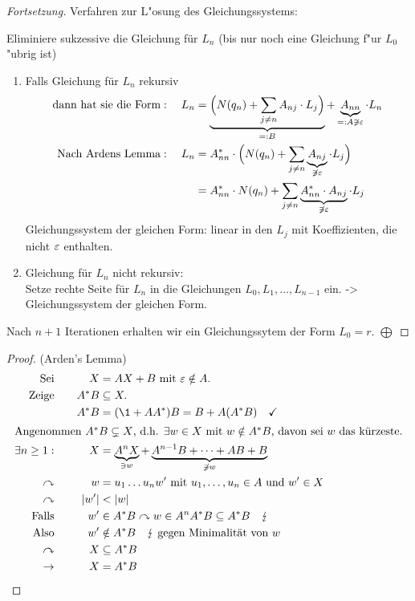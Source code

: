 \begin{proof}[Fortsetzung]
    Verfahren zur L"osung des Gleichungssystems:
    
	Eliminiere sukzessive die Gleichung für $L_n$ (bis nur noch eine Gleichung f"ur $L_0$ "ubrig ist)
	\begin{enumerate}[label=(\arabic*)]
		\item Falls Gleichung für $L_n$ rekursiv
			\begin{align*}
				\text{dann hat sie die Form}:\quad L_n &= \underbrace{\Big( N(q_n)+\sum_{j\neq n} A_{nj}\cdot L_j \Big)}_{=: B} + \underbrace{A_{nn}}_{=: A \not\ni \varepsilon}\cdot L_n\\
				\text{Nach Ardens Lemma}:\quad L_n &= A_{nn}^*\cdot \Big( N(q_n)+\sum_{j\neq n} \underbrace{A_{nj}}_{\not\ni\varepsilon} \cdot L_j \Big)\\
				&= A_{nn}^*\cdot N(q_n) + \sum_{j\neq n} \underbrace{A_{nn}^*\cdot A_{nj}}_{\not\ni\varepsilon} \cdot L_j
			\end{align*}
			Gleichungssystem der gleichen Form: linear in den $L_j$ mit Koeffizienten, die nicht $\varepsilon$ enthalten.
		\item Gleichung für $L_n$ nicht rekursiv:\\
		Setze rechte Seite für $L_n$ in die Gleichungen $L_0, L_1, \dots, L_{n-1}$ ein. \--> Gleichungssystem der gleichen Form.
	\end{enumerate}
    Nach $n+1$ Iterationen erhalten wir ein Gleichungssytem der Form $L_0=r$. \hfill$\bigoplus$
\end{proof}
\begin{proof}(Arden's Lemma)
	\begin{alignat*}{3}
		\text{Sei}&\quad& X&= AX+B\text{ mit }\Eps\notin A.\\
		\text{Zeige}&& A^*B&\subseteq X.\\
		&& A^*B &= (\1+AA^*)B = B+A(A^*B) \quad\checkmark\\
		\shortintertext{Angenommen $A^*B \subsetneq X$, d.h. $\exists w\in X$ mit $w\notin A^*B$, davon sei $w$ das kürzeste.}
		\exists n\geq 1: && X &= \underbrace{A^nX}_{\ni w} + \underbrace{A^{n-1}B+\dots +AB+B}_{\not\ni w}\\
		\curvearrowright && w &= u_1\dots u_n w'\text{ mit } u_1,\dots,u_n\in A\text{ und } w'\in X\\
		\curvearrowright && |w'| &< |w|\\
		\text{Falls}&& w'&\in A^*B \curvearrowright w\in A^nA^*B\subseteq A^*B \quad \lightning\\
		\text{Also} && w'&\notin A^*B \quad\lightning\text{ gegen Minimalität von }w\\
		\curvearrowright && X&\subseteq A^*B\\
		\-> && X &= A^*B \tag*{\qedhere}
	\end{alignat*}
\end{proof}


